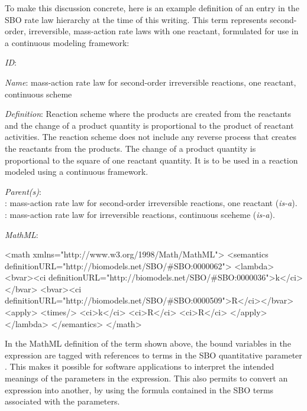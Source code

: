 To make this discussion concrete, here is an example definition of
an entry in the SBO rate law hierarchy at the time of this
writing.  This term represents second-order, irreversible,
mass-action rate laws with one reactant, formulated for use in a
continuous modeling framework:
\begin{description}

\item \emph{ID}: 

\item \emph{Name}: mass-action rate law for second-order
  irreversible reactions, one reactant, continuous scheme

\item \emph{Definition}: Reaction scheme where the products are
  created from the reactants and the change of a product quantity
  is proportional to the product of reactant activities. The
  reaction scheme does not include any reverse process that
  creates the reactants from the products. The change of a product
  quantity is proportional to the square of one reactant quantity.
  It is to be used in a reaction modeled using a continuous
  framework.

\item \emph{Parent(s)}: \\
  : mass-action rate law for second-order
    irreversible reactions, one reactant (\emph{is-a}).
    \\
    : mass-action rate law for irreversible
    reactions, continuous sceheme (\emph{is-a}).
  
\item \emph{MathML}:\vspace*{-1ex}
  \begin{example}
<math xmlns="http://www.w3.org/1998/Math/MathML">
   <semantics definitionURL="http://biomodels.net/SBO/#SBO:0000062">
      <lambda>
         <bvar><ci definitionURL="http://biomodels.net/SBO/#SBO:0000036">k</ci></bvar>
         <bvar><ci definitionURL="http://biomodels.net/SBO/#SBO:0000509">R</ci></bvar>
         <apply>
            <times/>
            <ci>k</ci>
            <ci>R</ci>
            <ci>R</ci>
         </apply>
      </lambda>
   </semantics>
</math>
\end{example}

\end{description}

In the MathML definition of the term shown above, the bound
variables in the  expression are tagged with
references to terms in the SBO quantitative parameter
.  This makes it
possible for software applications to interpret the intended
meanings of the parameters in the expression.  This also permits
to convert an expression into another, by using the \mathmltwo
formula contained in the SBO terms associated with the parameters.

